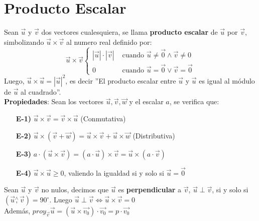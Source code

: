 \documentclass[11pt,a4paper]{article}
\begin{document}
\section{Producto Escalar}
\noindent Sean $\overrightarrow{u}$ y $\overrightarrow{v}$ dos vectores cualesquiera, se llama \textbf{producto escalar} de $\overrightarrow{u}$ por $\overrightarrow{v}$, simbolizando $\overrightarrow{u}\times\overrightarrow{v}$ al numero real definido por:
$$\overrightarrow{u}\times\overrightarrow{v}\left\{\begin{array}{ll}
|\overrightarrow{u}|\cdot|\overrightarrow{v}| & \text { cuando $\overrightarrow{u} \not = \overrightarrow{0} \land \overrightarrow{v}\not=0$}\\
0 & \text{ cuando $\overrightarrow{u} = \overrightarrow{0} \lor \overrightarrow{v} = \overrightarrow{0}$}
\end{array}\right.$$
Luego, $\overrightarrow{u}\times\overrightarrow{u} = |\overrightarrow{u}|^2$, es decir ”El producto escalar entre $\overrightarrow{u}$ y $\overrightarrow{u}$ es igual al módulo de $\overrightarrow{u}$ al cuadrado”.\\
\noindent \textbf{Propiedades}: Sean los vectores $\overrightarrow{u}, \overrightarrow{v}, \overrightarrow{w}$ y el escalar $a$, se verifica que:
\begin{itemize}
\item[\textbf{E-1)}] $\overrightarrow{u}\times\overrightarrow{v} = \overrightarrow{v}\times\overrightarrow{u}$ (Conmutativa)
\item[\textbf{E-2)}] $\overrightarrow{u}\times(\overrightarrow{v}+\overrightarrow{w}) = \overrightarrow{u}\times\overrightarrow{v} + \overrightarrow{u}\times\overrightarrow{w}$ (Distributiva)
\item[\textbf{E-3)}] $a\cdot(\overrightarrow{u}\times\overrightarrow{v}) = (a\cdot\overrightarrow{u})\times\overrightarrow{v} = \overrightarrow{u}\times(a\cdot\overrightarrow{v})$
\item[\textbf{E-4)}] $\overrightarrow{u}\times\overrightarrow{u} \geq 0$, valiendo la igualdad si y solo si $\overrightarrow{u} = \overrightarrow{0}$
\end{itemize}
\noindent Sean $\overrightarrow{u}$ y $\overrightarrow{v}$ no nulos, decimos que $\overrightarrow{u}$ es \textbf{perpendicular} a $\overrightarrow{v}$, $\overrightarrow{u}\perp\overrightarrow{v}$, si y solo si $(\overrightarrow{u}\overset{\wedge}{,}\overrightarrow{v}) = 90^\circ$. Luego $\overrightarrow{u}\perp\overrightarrow{v}\iff \overrightarrow{u}\times\overrightarrow{v}=0$\\
\noindent Adem\'as, $proy_{\overrightarrow{v}}\overrightarrow{u} = (\overrightarrow{u}\times\overrightarrow{v_0})\cdot \overrightarrow{v_0} = p \cdot \overrightarrow{v_0}$
\end{document}
